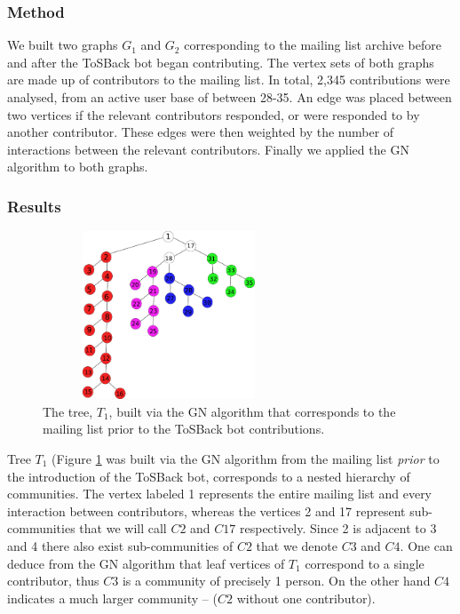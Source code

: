 \documentclass{sig-alternate}
\begin{document}
\subsubsection{Method}

We built two graphs $G_{1}$ and $G_2$ corresponding to the mailing list archive before and after the ToSBack bot began contributing. The vertex sets of both graphs are made up of contributors to the mailing list. In total, 2,345 contributions were analysed, from an active user base of between 28-35. An edge was placed between two vertices if the relevant contributors responded, or were responded to by another contributor. These edges were then weighted by the number of interactions between the relevant contributors. Finally we applied the GN algorithm to both graphs.

\subsubsection{Results}
\begin{figure}[H]
\includegraphics[width=7.5cm, height  = 5cm]{t15.pdf}\caption{ The tree, $T_1$, built via the GN algorithm that corresponds to the mailing list prior to the ToSBack bot contributions.}\label{fig:t1}
\end{figure}

Tree $T_1$ (Figure \ref{fig:t1} was built via the GN algorithm from the mailing list \emph{prior} to the introduction of the ToSBack bot, corresponds to a nested hierarchy of communities. The vertex labeled 1 represents the entire mailing list and every interaction between contributors, whereas the vertices 2 and 17 represent sub-communities that we will call $C2$ and $C17$ respectively. Since 2 is adjacent to 3 and 4 there also exist sub-communities of $C2$ that we denote $C3$ and $C4$. One can deduce from the GN algorithm that leaf vertices of $T_1$ correspond to a single contributor, thus $C3$ is a community of precisely 1 person. On the other hand $C4$ indicates a much larger community – ($C2$ without one contributor).
\end{document}
